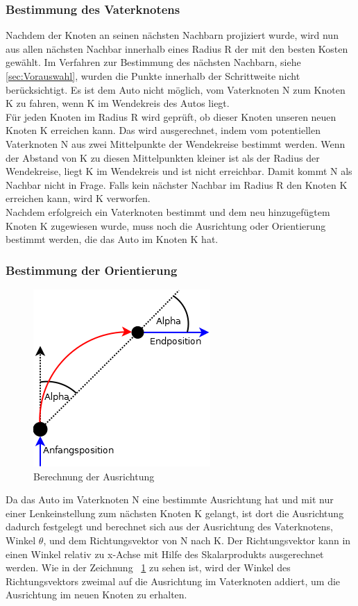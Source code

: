 \subsubsection{Bestimmung des Vaterknotens}
Nachdem der Knoten an seinen nächsten Nachbarn projiziert wurde, wird nun aus allen nächsten Nachbar innerhalb eines Radius R der mit den besten Kosten gewählt. Im Verfahren zur Bestimmung des nächsten Nachbarn, siehe \ref{sec:Vorauswahl}, wurden die Punkte innerhalb der Schrittweite nicht berücksichtigt. Es ist dem Auto nicht möglich, vom Vaterknoten N zum Knoten K zu fahren, wenn K im Wendekreis des Autos liegt. \\
Für jeden Knoten im Radius R wird geprüft, ob dieser Knoten unseren neuen Knoten K erreichen kann. Das wird ausgerechnet, indem vom potentiellen Vaterknoten N aus zwei Mittelpunkte der Wendekreise bestimmt werden. Wenn der Abstand von K zu diesen Mittelpunkten kleiner ist als der Radius der Wendekreise, liegt K im Wendekreis und ist nicht erreichbar. Damit kommt N als Nachbar nicht in Frage. Falls kein nächster Nachbar im Radius R den Knoten K erreichen kann, wird K verworfen. \\
Nachdem erfolgreich ein Vaterknoten bestimmt und dem neu hinzugefügtem Knoten K zugewiesen wurde, muss noch die Ausrichtung oder Orientierung bestimmt werden, die das Auto im Knoten K hat.
\subsubsection{Bestimmung der Orientierung}

\begin{figure}
\label{fig:fig8}
\centering
\includegraphics[scale=1]{Bilder/BerechnungOrientierung.png} 
\caption{Berechnung der Ausrichtung}
\end{figure}
Da das Auto im Vaterknoten N eine bestimmte Ausrichtung hat und mit nur einer Lenkeinstellung zum nächsten Knoten K gelangt, ist dort die Ausrichtung dadurch festgelegt und berechnet sich aus der Ausrichtung des Vaterknotens, Winkel $\theta$, und dem Richtungsvektor von N nach K. Der Richtungsvektor kann in einen Winkel relativ zu x-Achse mit Hilfe des Skalarprodukts ausgerechnet werden. Wie in der Zeichnung ~\ref{fig:fig8} zu sehen ist, wird der Winkel des Richtungsvektors zweimal auf die Ausrichtung im Vaterknoten addiert, um die Ausrichtung im neuen Knoten zu erhalten. \\

